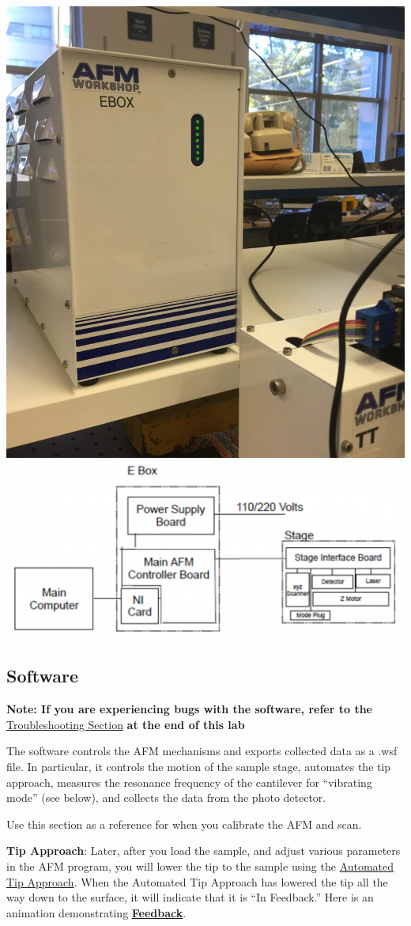 \documentclass{../lab}
\begin{document}
\begin{center}
    \href{http://experimentationlab.berkeley.edu/sites/default/files/EBOX.jpg}{\includegraphics[width=0.4\linewidth,keepaspectratio]{images/EBOX.jpg}}
    \href{http://experimentationlab.berkeley.edu/sites/default/files/AFMImages/AFMconnections.PNG}{\includegraphics[width=0.4\linewidth,keepaspectratio]{images/AFMconnections.PNG}}
\end{center}

\subsection{Software}

\textbf{Note: If you are experiencing bugs with the software, refer to the} \hyperref[sec:troubleshooting]{Troubleshooting Section} \textbf{at the end of this lab}

The software controls the AFM mechanisms and exports collected data as a .wsf file. In particular, it controls the motion of the sample stage, automates the tip approach, measures the resonance frequency of the cantilever for ``vibrating mode'' (see below), and collects the data from the photo detector.

Use this section as a reference for when you calibrate the AFM and scan.

\textbf{Tip Approach}:  Later, after you load the sample, and adjust various parameters in the AFM program, you will lower the tip to the sample using the \hyperref[subsec:TipApproach]{Automated Tip Approach}.  When the Automated Tip Approach has lowered the tip all the way down to the surface, it will indicate that it is ``In Feedback.'' Here is an animation demonstrating \href{http://experimentationlab.berkeley.edu/sites/default/files/AFMImages/4.4.\%20feedback.flv\_converted.mp4}{\textbf{Feedback}}.
\end{document}

